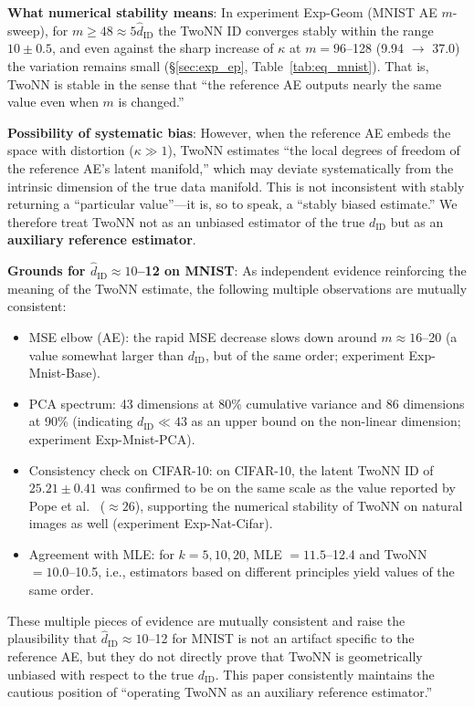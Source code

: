 \documentclass[make,article,submit,pdftex,moreauthors]{Definitions/mdpi}
\begin{document}
\textbf{What numerical stability means}:
In experiment Exp-Geom (MNIST AE $m$-sweep), for $m \geq 48 \approx 5\hat{d}_\mathrm{ID}$
the TwoNN ID converges stably within the range $10 \pm 0.5$, and even against the sharp
increase of $\kappa$ at $m = 96$--128 (9.94 $\to$ 37.0) the variation remains small
(\S\ref{sec:exp_ep}, Table~\ref{tab:eq_mnist}).
That is, TwoNN is stable in the sense that ``the reference AE outputs nearly the same
value even when $m$ is changed.''

\textbf{Possibility of systematic bias}:
However, when the reference AE embeds the space with distortion ($\kappa \gg 1$),
TwoNN estimates ``the local degrees of freedom of the reference AE's latent manifold,''
which may deviate systematically from the intrinsic dimension of the true data manifold.
This is not inconsistent with stably returning a ``particular value''---it is, so to
speak, a ``stably biased estimate.''
We therefore treat TwoNN not as an unbiased estimator of the true $d_\mathrm{ID}$ but as
an \textbf{auxiliary reference estimator}.

\textbf{Grounds for $\hat{d}_\mathrm{ID} \approx 10$--12 on MNIST}:
As independent evidence reinforcing the meaning of the TwoNN estimate, the following
multiple observations are mutually consistent:
\begin{itemize}
  \item MSE elbow (AE): the rapid MSE decrease slows down around $m \approx 16$--20
        (a value somewhat larger than $d_\mathrm{ID}$, but of the same order; experiment
        Exp-Mnist-Base).
  \item PCA spectrum: 43 dimensions at 80\% cumulative variance and 86 dimensions at 90\%
        (indicating $d_\mathrm{ID} \ll 43$ as an upper bound on the non-linear dimension;
        experiment Exp-Mnist-PCA).
  \item Consistency check on CIFAR-10: on CIFAR-10, the latent TwoNN ID of $25.21\pm0.41$
        was confirmed to be on the same scale as the value reported by Pope et
        al.~\cite{pope2021intrinsic} ($\approx26$), supporting the numerical stability of
        TwoNN on natural images as well (experiment Exp-Nat-Cifar).
  \item Agreement with MLE: for $k=5,10,20$, MLE $=11.5$--12.4 and TwoNN $=10.0$--10.5,
        i.e., estimators based on different principles yield values of the same order.
\end{itemize}
These multiple pieces of evidence are mutually consistent and raise the plausibility
that $\hat{d}_\mathrm{ID} \approx 10$--12 for MNIST is not an artifact specific to the
reference AE, but they do not directly prove that TwoNN is geometrically unbiased with
respect to the true $d_\mathrm{ID}$.
This paper consistently maintains the cautious position of ``operating TwoNN as an
auxiliary reference estimator.''
\end{document}
